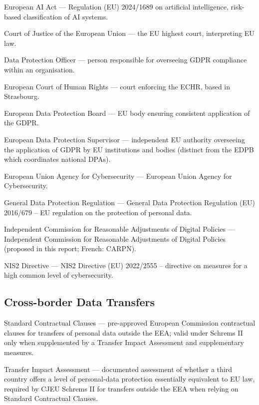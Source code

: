\begin{description}[style=nextline, leftmargin=2.5cm, font=\normalfont\bfseries]
    \item[\glstarget{aiact}AI Act] European AI Act --- Regulation (EU) 2024/1689 on artificial intelligence, risk-based classification of AI systems.
    \item[\glstarget{cjeu}CJEU] Court of Justice of the European Union --- the EU highest court, interpreting EU law.
    \item[\glstarget{dpo}DPO] Data Protection Officer --- person responsible for overseeing GDPR compliance within an organisation.
    \item[\glstarget{ecthr}ECtHR] European Court of Human Rights --- court enforcing the ECHR, based in Strasbourg.
    \item[\glstarget{edpb}EDPB] European Data Protection Board --- EU body ensuring consistent application of the GDPR.
    \item[\glstarget{edps}EDPS] European Data Protection Supervisor --- independent EU authority overseeing the application of GDPR by EU institutions and bodies (distinct from the EDPB which coordinates national DPAs).
    \item[\glstarget{enisa}ENISA] European Union Agency for Cybersecurity --- European Union Agency for Cybersecurity.
    \item[\glstarget{gdpr}GDPR] General Data Protection Regulation --- General Data Protection Regulation (EU) 2016/679 -- EU regulation on the protection of personal data.
    \item[\glstarget{icradp}ICRADP] Independent Commission for Reasonable Adjustments of Digital Policies --- Independent Commission for Reasonable Adjustments of Digital Policies (proposed in this report; French: CARPN).
    \item[\glstarget{nis2}NIS2] NIS2 Directive --- NIS2 Directive (EU) 2022/2555 -- directive on measures for a high common level of cybersecurity.
\end{description}

\subsection*{Cross-border Data Transfers}

\begin{description}[style=nextline, leftmargin=2.5cm, font=\normalfont\bfseries]
    \item[\glstarget{scc}SCC] Standard Contractual Clauses --- pre-approved European Commission contractual clauses for transfers of personal data outside the EEA; valid under Schrems II only when supplemented by a Transfer Impact Assessment and supplementary measures.
    \item[\glstarget{tia}TIA] Transfer Impact Assessment --- documented assessment of whether a third country offers a level of personal-data protection essentially equivalent to EU law, required by CJEU Schrems II for transfers outside the EEA when relying on Standard Contractual Clauses.
\end{description}

